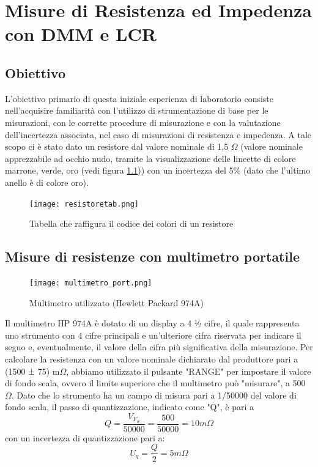 \chapter{Misure di Resistenza ed Impedenza con DMM e LCR}
\label{chap:prima_prova}


\section*{Obiettivo}
\label{sec:ob_first}

L'obiettivo primario di questa iniziale esperienza di laboratorio consiste nell'acquisire familiarità con l'utilizzo di strumentazione di base per le misurazioni, con le corrette procedure di misurazione e con la valutazione dell'incertezza associata, nel caso di misurazioni di resistenza e impedenza.
\newline \newline
A tale scopo ci è stato dato un resistore dal valore nominale di 1,5 $\Omega$ (valore nominale apprezzabile ad occhio nudo, tramite la visualizzazione delle lineette di colore marrone, verde, oro (vedi figura \ref{fig:resistore})) con un incertezza del 5\% (dato che l'ultimo anello è di colore oro).

\begin{figure}[h]
    \centering
    \texttt{[image: resistoretab.png]}
    \caption{Tabella che raffigura il codice dei colori di un resistore}
    \label{fig:resistore}
\end{figure}
\FloatBarrier
\clearpage




\section{Misure di resistenze con multimetro portatile}
\label{sec:mult_port}

\begin{figure}[h]
    \centering
    \texttt{[image: multimetro\_port.png]}
    \caption{Multimetro utilizzato (Hewlett Packard 974A)}
    \label{fig:multimetro_port}
\end{figure}
\FloatBarrier

Il multimetro HP 974A è dotato di un display a 4 ½ cifre, il quale rappresenta uno strumento con 4 cifre principali e un'ulteriore cifra riservata per indicare il segno e, eventualmente, il valore della cifra più significativa della misurazione. Per calcolare la resistenza con un valore nominale dichiarato dal produttore pari a (1500 ± 75) m$\Omega$, abbiamo utilizzato il pulsante "RANGE" per impostare il valore di fondo scala, ovvero il limite superiore che il multimetro può "misurare", a 500 $\Omega$. Dato che lo strumento ha un campo di misura pari a 1/50000 del valore di fondo scala, il passo di quantizzazione, indicato come "Q", è pari a
\begin{equation}
    Q = \frac{V_{F_S}}{50000} = \frac{500}{50000} = 10 m\Omega
\end{equation}
con un incertezza di quantizzazione pari a: 
\begin{equation}
    U_q = \frac{Q}{2} = 5 m\Omega
\end{equation}

